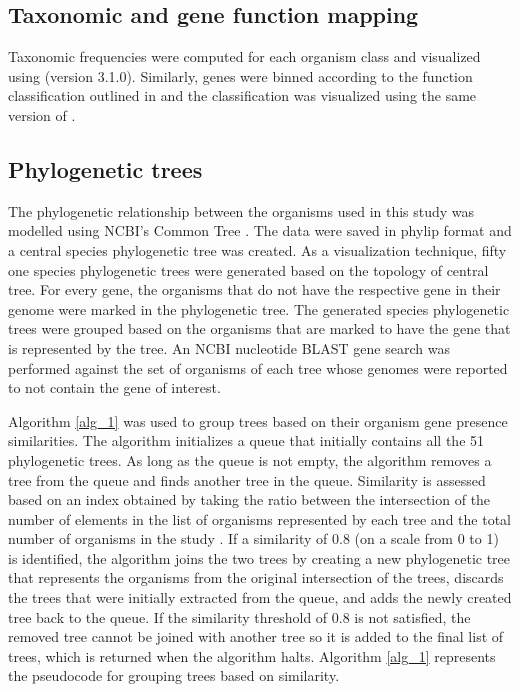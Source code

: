 \documentclass{article}
\begin{document}
\subsection*{Taxonomic and gene function mapping}
Taxonomic frequencies were computed for each organism class and visualized using \cite{matplotlib} (version 3.1.0). Similarly, genes were binned according to the function classification outlined in \cite{pg_chapter} and the classification was visualized using the same version of \cite{matplotlib}.

\subsection*{Phylogenetic trees}
The phylogenetic relationship between the organisms used in this study was modelled using NCBI's Common Tree \cite{ncbi_tax_1, ncbi_tax_2}. The data were saved in phylip format and a central species phylogenetic tree was created. As a visualization technique, fifty one species phylogenetic trees were generated based on the topology of central tree. For every gene, the organisms that do not have the respective gene in their genome were marked in the phylogenetic tree. The generated species phylogenetic trees were grouped based on the organisms that are marked to have the gene that is represented by the tree. An NCBI nucleotide BLAST gene search was performed against the set of organisms of each tree whose genomes were reported to not contain the gene of interest.

Algorithm \ref{alg_1} was used to group trees based on their organism gene presence similarities. The algorithm initializes a queue that initially contains all the 51 phylogenetic trees. As long as the queue is not empty, the algorithm removes a tree from the queue and finds another tree in the queue. Similarity is assessed based on an index obtained by taking the ratio between the intersection of the number of elements in the list of organisms represented by each tree and the total number of organisms in the study \cite{jaccard}. If a similarity of 0.8 (on a scale from 0 to 1) is identified, the algorithm joins the two trees by creating a new phylogenetic tree that represents the organisms from the original intersection of the trees, discards the trees that were initially extracted from the queue, and adds the newly created tree back to the queue. If the similarity threshold of 0.8 is not satisfied, the removed tree cannot be joined with another tree so it is added to the final list of trees, which is returned when the algorithm halts. Algorithm \ref{alg_1} represents the pseudocode for grouping trees based on similarity.
\end{document}
